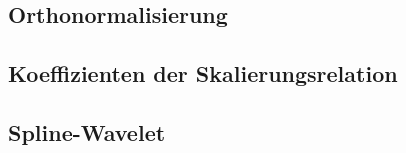 \subsection{Orthonormalisierung
\label{subsection:spline-orthonormalisierung}}

\subsection{Koeffizienten der Skalierungsrelation
\label{subsection:spline-skalierungskoeffizienten}}

\subsection{Spline-Wavelet
\label{subsection:spline-wavelet}}





